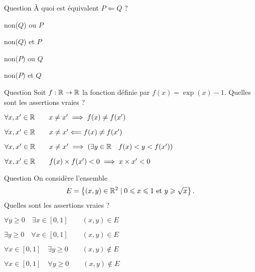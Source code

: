 \begin{multi}[multiple,feedback=
{La définition (à connaître) de "\(P \implies Q\)" est "non(\(P\)) ou \(Q\)".
}]{Question}
À quoi est équivalent \(P \Longleftarrow Q\) ?

    \item* non(\(Q\)) ou \(P\)
    \item non(\(Q\)) et \(P\)
    \item non(\(P\)) ou \(Q\)
    \item non(\(P\)) et \(Q\)
\end{multi}


\begin{multi}[multiple,feedback=
{Dessiner le graphe de \(f\) pour mieux comprendre ! 
Même si \(f(x) \neq f(x')\) cela ne veut pas dire que \(f(x) < f(x')\), l'inégalité pourrait être dans l'autre sens.
}]{Question}
Soit \(f : \mathbb{R} \to \mathbb{R}\) la fonction définie par \(f(x)=\exp(x)-1\).
Quelles sont les assertions vraies ?

    \item* \(\forall x,x' \in \mathbb{R}  \qquad x \neq x' \implies f(x) \neq f(x')\)
    \item* \(\forall x,x' \in \mathbb{R}  \qquad x \neq x' \Longleftarrow f(x) \neq f(x')\)
    \item \(\forall x,x' \in \mathbb{R}  \qquad x \neq x' \implies (\exists y \in \mathbb{R} \quad f(x) < y < f(x'))\)
    \item* \(\forall x,x' \in \mathbb{R}  \qquad  f(x)\times f(x') < 0 \implies x\times x' < 0\)
\end{multi}


\begin{multi}[multiple,feedback=
{Faire un dessin de l'ensemble \(E\).
}]{Question}
On considère l'ensemble 
\[E = \left\{ (x,y) \in \mathbb{R}^2 \mid 0 \leqslant x \leqslant 1 \text{ et } y \geqslant \sqrt{x}  \right\}.\]
Quelles sont les assertions vraies ?

    \item* \(\forall y \ge 0 \quad \exists x \in [0,1] \qquad (x,y) \in E\)
    \item* \(\exists y \ge 0 \quad \forall x \in [0,1] \qquad (x,y) \in E\)
    \item \(\forall x \in [0,1] \quad \exists y \ge 0 \qquad (x,y) \notin E\)
    \item \(\forall x \in [0,1] \quad \forall y \ge 0 \qquad (x,y) \notin E\)
\end{multi}


